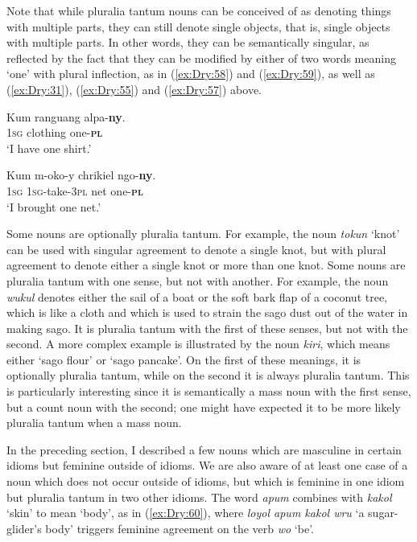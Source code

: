 \documentclass[output=collectionpaper]{langsci/langscibook}
\begin{document}
Note that while pluralia tantum nouns can be conceived of as denoting things with multiple parts, they can still denote single objects, that is, single objects with multiple parts. In other words, they can be semantically singular, as reflected by the fact that they can be modified by either of two words meaning `one' with plural inflection, as in (\ref{ex:Dry:58}) and (\ref{ex:Dry:59}), as well as (\ref{ex:Dry:31}), (\ref{ex:Dry:55}) and (\ref{ex:Dry:57}) above.

\ea \label{ex:Dry:58}
\gll Kum	ranguang	alpa-\textbf{ny}.\\
\textsc{1sg} clothing one-\textbf{\textsc{pl}}\\
\glt `I have one shirt.'
\z

\ea \label{ex:Dry:59}
\gll Kum	m-oko-y	chrikiel	ngo-\textbf{ny}.\\
\textsc{1sg} \textsc{1sg}-take-\textsc{3pl} net one-\textbf{\textsc{pl}}\\
\glt `I brought one net.'
\z

Some nouns are optionally pluralia tantum. For example, the noun \textit{tokun} `knot' can be used with singular agreement to denote a single knot, but with plural agreement to denote either a single knot or more than one knot. Some nouns are pluralia tantum with one sense, but not with another. For example, the noun \textit{wukul} denotes either the sail of a boat or the soft bark flap of a coconut tree, which is like a cloth and which is used to strain the sago dust out of the water in making sago. It is pluralia tantum with the first of these senses, but not with the second. A more complex example is illustrated by the noun \textit{kiri}, which means either `sago flour' or `sago pancake'. On the first of these meanings, it is optionally pluralia tantum, while on the second it is always pluralia tantum. This is particularly interesting since it is semantically a mass noun with the first sense, but a count noun with the second; one might have expected it to be more likely pluralia tantum when a mass noun.

In the preceding section, I described a few nouns which are masculine in certain idioms but feminine outside of idioms. We are also aware of at least one case of a noun which does not occur outside of idioms, but which is feminine in one idiom but pluralia tantum in two other idioms. The word \textit{apum} combines with \textit{kakol} `skin' to mean `body', as in (\ref{ex:Dry:60}), where \textit{loyol apum kakol wru} `a sugar-glider's body' triggers feminine agreement on the verb \textit{wo} `be'.
\end{document}
